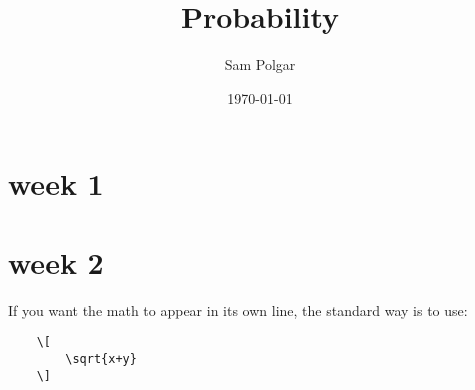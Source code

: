 \documentclass[10pt]{article}
\begin{document}
\title{Probability}

\author{%
   Sam Polgar%
}

\date{\today}

\maketitle

\section{week 1}


\section{week 2}









If you want the math to appear in its own line, the standard way is to use:

\begin{verbatim}
    \[
        \sqrt{x+y}
    \]
\end{verbatim}




%    
%    
\end{document}
